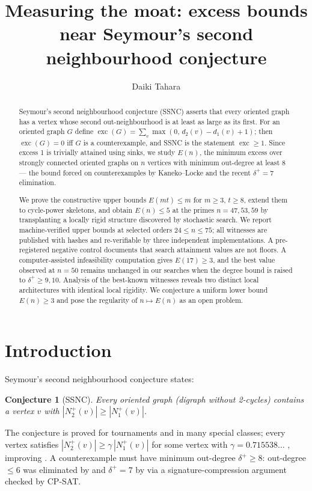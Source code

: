 \documentclass[11pt]{amsart}
\title[Measuring the moat]{Measuring the moat: excess bounds near
Seymour's second neighbourhood conjecture}
\author{Daiki Tahara}
\newtheorem{conjecture}[theorem]{Conjecture}
\theoremstyle{remark}
\newcommand{\exc}{\operatorname{exc}}
\begin{document}
\begin{abstract}
Seymour's second neighbourhood conjecture (SSNC) asserts that every
oriented graph has a vertex whose second out-neighbourhood is at least as
large as its first. For an oriented graph $G$ define
$\exc(G) = \sum_v \max(0,\, d_2(v) - d_1(v) + 1)$; then $\exc(G) = 0$ iff
$G$ is a counterexample, and SSNC is the statement $\exc \ge 1$. Since
excess 1 is trivially attained using sinks, we study $E(n)$, the minimum
excess over strongly connected oriented graphs on $n$ vertices with minimum
out-degree at least 8 --- the bound forced on counterexamples by
Kaneko--Locke and the recent $\delta^+ = 7$ elimination.

We prove the constructive upper bounds $E(mt) \le m$ for $m \ge 3$,
$t \ge 8$, extend them to cycle-power skeletons, and obtain $E(n) \le 5$ at
the primes $n = 47, 53, 59$ by transplanting a locally rigid structure
discovered by stochastic search. We report machine-verified upper bounds at
selected orders $24 \le n \le 75$; all witnesses are published with hashes
and re-verifiable by three independent implementations. A pre-registered
negative control documents that search attainment values are not floors. A
computer-assisted infeasibility computation gives $E(17) \ge 3$, and the
best value observed at $n = 50$ remains unchanged in our searches when the
degree bound is raised to $\delta^+ \ge 9, 10$. Analysis of the best-known witnesses reveals two
distinct local architectures with identical local rigidity. We conjecture a
uniform lower bound $E(n) \ge 3$ and pose the regularity of
$n \mapsto E(n)$ as an open problem.
\end{abstract}

\maketitle

\section{Introduction}

Seymour's second neighbourhood conjecture \cite{DeanLatka1995} states:

\begin{conjecture}[SSNC]
Every oriented graph (digraph without 2-cycles) contains a vertex $v$ with
$|N_2^+(v)| \ge |N_1^+(v)|$.
\end{conjecture}

The conjecture is proved for tournaments \cite{Fisher1996,HavetThomasse2000}
and in many special classes; every vertex satisfies
$|N_2^+(v)| \ge \gamma\,|N_1^+(v)|$ for some vertex with
$\gamma = 0.715538\ldots$ \cite{HuangPeng2024}, improving
\cite{ChenShenYuster2003}. A counterexample must have minimum out-degree
$\delta^+ \ge 8$: out-degree $\le 6$ was eliminated by \cite{KanekoLocke2001}
and $\delta^+ = 7$ by \cite{SadhukhanSandeepSen2026} via a
signature-compression argument checked by CP-SAT.
\end{document}
